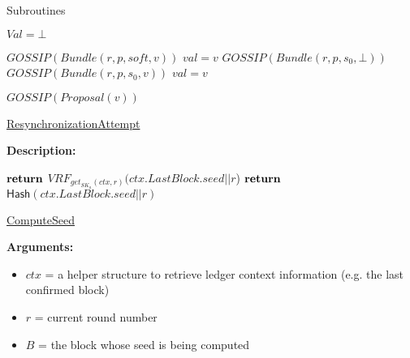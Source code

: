 \documentclass[10pt,a4paper]{article}
\begin{document}
\begin{section}{Subroutines}


\begin{algorithm}[H]
    \begin{algorithmic}[1]

    \State $Val = \bot$

        \State $GOSSIP(Bundle(r, p, soft, v))$
        \State $val = v$    
        \State $GOSSIP(Bundle(r, p, s_0, \bot))$
        \State $GOSSIP(Bundle(r, p, s_0, v))$
        \State $val = v$   
    \EndIf

        \State $GOSSIP(Proposal(v))$
    \EndIf

    \EndFunction
    \end{algorithmic}
    \caption{\underline{ResynchronizationAttempt}}
\end{algorithm}

\noindent \textbf{Description:}\\


\begin{algorithm}[H]
    \begin{algorithmic}[1]
            \State $\Return$ $VRF_{get_{SK_a}(ctx, r)}(ctx.LastBlock.seed||r$)
        \Else
            \State $\Return$ $\mathsf{Hash}(ctx.LastBlock.seed||r)$
        \EndIf
    \EndFunction
    \end{algorithmic}
    \caption{\underline{ComputeSeed}}
\end{algorithm}


\noindent \textbf{Arguments:}
\begin{itemize}
    \item $ctx$ = a helper structure to retrieve ledger context information (e.g. the last confirmed block)
    \item $r$ = current round number
    \item $B$ = the block whose seed is being computed
  \end{itemize}



\end{section}
\end{document}
